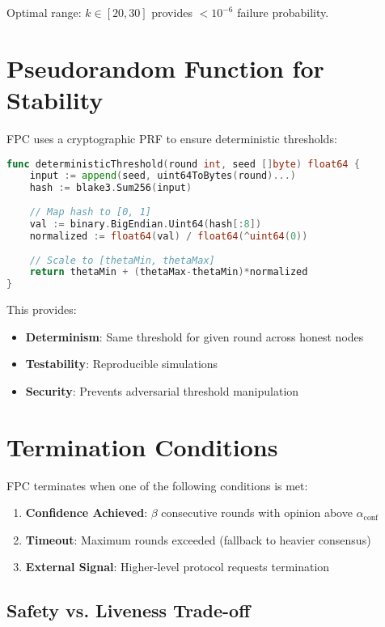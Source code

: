 \documentclass[11pt,a4paper]{article}
\begin{document}
Optimal range: $k \in [20, 30]$ provides $< 10^{-6}$ failure probability.

\section{Pseudorandom Function for Stability}
\label{sec:prf}

FPC uses a cryptographic PRF to ensure deterministic thresholds:

\begin{lstlisting}[language=Go, caption=PRF-based threshold stability]
func deterministicThreshold(round int, seed []byte) float64 {
    input := append(seed, uint64ToBytes(round)...)
    hash := blake3.Sum256(input)
    
    // Map hash to [0, 1]
    val := binary.BigEndian.Uint64(hash[:8])
    normalized := float64(val) / float64(^uint64(0))
    
    // Scale to [thetaMin, thetaMax]
    return thetaMin + (thetaMax-thetaMin)*normalized
}
\end{lstlisting}

This provides:
\begin{itemize}
\item \textbf{Determinism}: Same threshold for given round across honest nodes
\item \textbf{Testability}: Reproducible simulations
\item \textbf{Security}: Prevents adversarial threshold manipulation
\end{itemize}

\section{Termination Conditions}
\label{sec:termination}

FPC terminates when one of the following conditions is met:

\begin{enumerate}
\item \textbf{Confidence Achieved}: $\beta$ consecutive rounds with opinion above $\alpha_{\text{conf}}$
\item \textbf{Timeout}: Maximum rounds exceeded (fallback to heavier consensus)
\item \textbf{External Signal}: Higher-level protocol requests termination
\end{enumerate}

\subsection{Safety vs. Liveness Trade-off}
\end{document}
